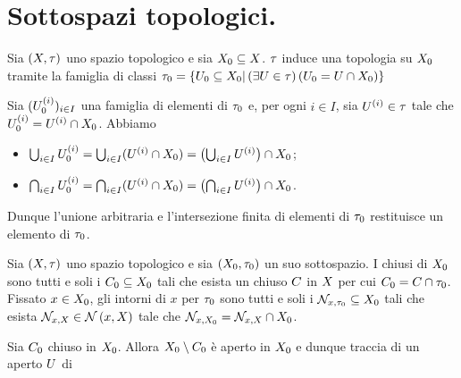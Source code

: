 \section{Sottospazi topologici.}\label{SottospaziTopologici}
\begin{Theorem}
	Sia $(X,\tau)$ uno spazio topologico e sia
	$X_0 \subseteq X$. $\tau$ induce
	una topologia su $X_0$ tramite la famiglia di
	classi $\tau_0 = \lbrace U_0 \subseteq
	X_0 | \left ( \exists U \in \tau \right ) \left ( U_0 = U
	\cap X_0 \right ) \rbrace$
\end{Theorem}
\Proof Sia $(U^{(i)}_0)_{i \in I}$ una famiglia di elementi di
$\tau_0$ e, per ogni $i \in I$, sia $U^{(i)} \in \tau$ tale
che $U^{(i)}_0 = U^{(i)} \cap X_0$.
Abbiamo
\begin{itemize}
	\item $\bigcup_{i \in I} U^{(i)}_0 =
	\bigcup_{i \in I} (U^{(i)} \cap X_0) =
	\left ( \bigcup_{i \in I} U^{(i)} \right ) \cap
	X_0$;
	\item $\bigcap_{i \in I} U^{(i)}_0 =
	\bigcap_{i \in I} (U^{(i)} \cap X_0) =
	\left ( \bigcap_{i \in I} U^{(i)} \right ) \cap
	X_0$.
\end{itemize}
\par Dunque l'unione arbitraria e l'intersezione finita  di elementi di
$\tau_0$ restituisce un elemento di $\tau_0$. \EndProof
\begin{Theorem}
	Sia $(X,\tau)$ uno spazio topologico e sia
	$(X_0,\tau_0)$ un suo sottospazio.
	I chiusi di $X_0$ sono tutti e soli i
	$C_0 \subseteq X_0$ tali che esista un
	chiuso $C$ in $X$ per cui $C_0 =
	C \cap \tau_0$. Fissato $x \in X_0$,
	gli intorni di $x$ per $\tau_0$ sono tutti e soli i
	$\mathcal{N}_{x,\tau_0} \subseteq X_0$  tali che esista
	$\Neighborhood_{x,\TopologicalSpace} \in \Neighborhoods{x}[\TopologicalSpace]$ tale che
	$\mathcal{N}_{x,X_0} = \mathcal{N}_{x,X} \cap
	X_0$.
\end{Theorem}
\Proof Sia $C_0$ chiuso in $X_0$. Allora
$X_0 \setminus C_0$ \`e aperto in
$X_0$ e dunque traccia di un aperto $U$ di
